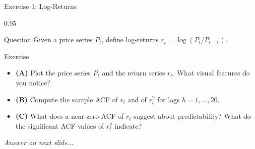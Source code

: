\documentclass[9pt, aspectratio=169, t]{beamer}
\begin{document}
\begin{frame}{Exercise 1: Log-Returns}
    \begin{cminipage}{0.95\textwidth}
    \begin{alertblock}{Question}
        Given a price series $P_t$, define log-returns $r_t = \log(P_t / P_{t-1})$.
    \end{alertblock}

    \vspace{0.3cm}

    \begin{block}{Exercise}
        \begin{itemize}\setlength{\itemsep}{3pt}
            \item \textcolor{MainBlue}{\textbf{(A)}} Plot the price series $P_t$ and the return series $r_t$. What visual features do you notice?
            \item \textcolor{MainBlue}{\textbf{(B)}} Compute the sample ACF of $r_t$ and of $r_t^2$ for lags $h = 1, \ldots, 20$.
            \item \textcolor{MainBlue}{\textbf{(C)}} What does a near-zero ACF of $r_t$ suggest about predictability? What do the significant ACF values of $r_t^2$ indicate?
        \end{itemize}
    \end{block}

    \vspace{0.3cm}

    \begin{center}
        \textit{Answer on next slide...}
    \end{center}
    \end{cminipage}
\end{frame}
\end{document}
